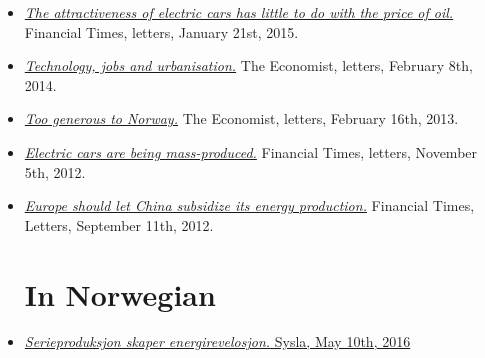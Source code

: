 \documentclass[margin]{res}
\begin{document}
\begin{resume}
\begin{itemize}
\item[] \href{http://www.ft.com/intl/cms/s/0/313360bc-a00c-11e4-aa89-00144feab7de.html#axzz3PVKMfhY5}{\emph{The attractiveness of electric cars has little to do with the price of oil.}} Financial Times, letters, January 21st, 2015.

\item[] \href{http://www.economist.com/news/letters/21595871-livestock-and-emissions-california-technology-and-jobs-algorithms}{\emph{Technology, jobs and urbanisation.}}   The Economist, letters, February 8th, 2014.

\item[] \href{http://www.economist.com/news/letters/21571848-nordic-countries-private-schools-immigration-sandhurst-ed-koch-richard-iii}{\emph{Too generous to Norway.}} The Economist, letters, February 16th, 2013.

\item[] \href{http://www.ft.com/intl/cms/s/0/26168da6-238d-11e2-bb86-00144feabdc0.html#axzz2sclP2DP5}{\emph{Electric cars are being mass-produced.}}  Financial Times, letters, November 5th, 2012.

\item[] \href{http://www.ft.com/intl/cms/s/0/553d8cf6-fb56-11e1-87ae-00144feabdc0.html#axzz2sclP2DP5}{\emph{Europe should let China subsidize its energy production.}}  Financial Times, Letters, September 11th, 2012.


\normalsize{\section{In Norwegian}}

\item[] \href{http://syslagronn.no/2016/05/12/syslagronn/serieproduksjon-skaper-energirevolusjon_87844/.VzQ1IfhgWKc.twitter}{\emph{Serieproduksjon skaper energirevelosjon.} Sysla, May 10th, 2016}


\end{itemize}
\end{resume}
\end{document}
